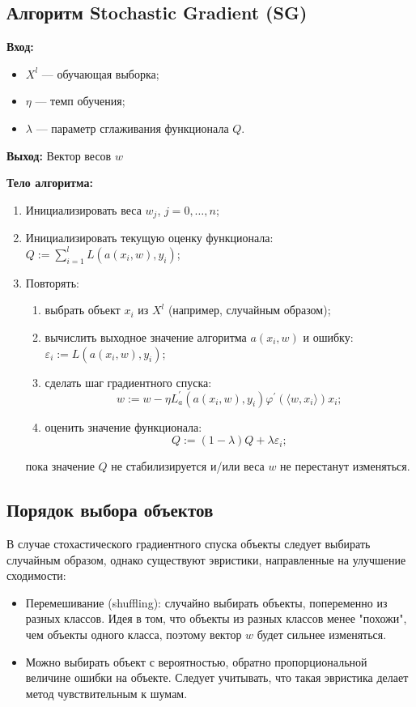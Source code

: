 \subsection*{Алгоритм Stochastic Gradient (SG)}
\textbf{Вход:}
\begin{itemize}
    \item \( X^l \) --- обучающая выборка;
    \item \( \eta \) --- темп обучения;
    \item \( \lambda \) --- параметр сглаживания функционала \( Q \).
\end{itemize}

\textbf{Выход:} Вектор весов \( w \)

\textbf{Тело алгоритма:}
\begin{enumerate}
    \item Инициализировать веса \( w_j \), \( j = 0, \dots, n \);
    \item Инициализировать текущую оценку функционала: \( Q := \sum_{i=1}^l L(a(x_i, w), y_i) \);
    \item Повторять:
    \begin{enumerate}
        \item выбрать объект \( x_i \) из \( X^l \) (например, случайным образом);
        \item вычислить выходное значение алгоритма \( a(x_i, w) \) и ошибку: \( \varepsilon_i := L(a(x_i, w), y_i) \);
        \item сделать шаг градиентного спуска:
        $$ w := w - \eta L_a^\prime (a(x_i, w), y_i) \varphi^\prime (\langle w, x_i \rangle)x_i; $$
        \item оценить значение функционала:
        $$ Q := (1 - \lambda)Q + \lambda\varepsilon_i; $$
    \end{enumerate}
    пока значение \( Q \) не стабилизируется и/или веса \( w \) не перестанут изменяться.
\end{enumerate}

\subsection*{Порядок выбора объектов}
В случае стохастического градиентного спуска объекты следует выбирать случайным образом, однако существуют эвристики, направленные на улучшение сходимости:
\begin{itemize}
    \item Перемешивание (shuffling): случайно выбирать объекты, попеременно из разных классов. Идея в том, что объекты из разных классов менее "похожи", чем объекты одного класса, поэтому вектор \( w \) будет сильнее изменяться.
    \item Можно выбирать объект с вероятностью, обратно пропорциональной величине ошибки на объекте. Следует учитывать, что такая эвристика делает метод чувствительным к шумам.
\end{itemize}

